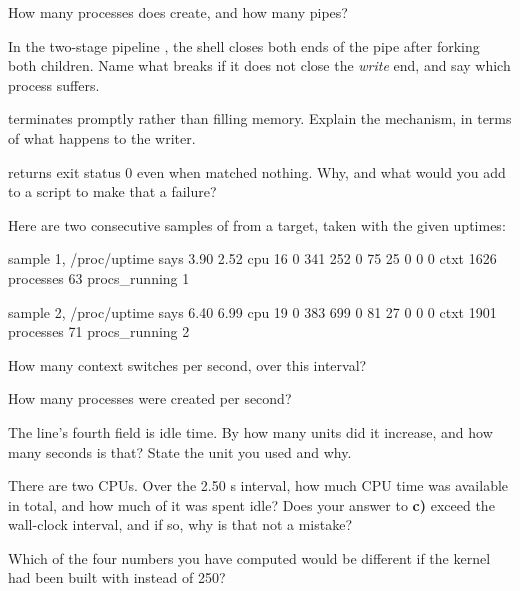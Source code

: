  How many processes does  create, and how many pipes?

 In the two-stage pipeline , the shell closes both ends of the pipe after
forking both children. Name what breaks if it does not close the \emph{write} end, and say which
process suffers.

  terminates promptly rather than filling memory. Explain the
mechanism, in terms of what happens to the writer.

  returns exit status 0 even when  matched
nothing. Why, and what would you add to a script to make that a failure?

\label{c2:ex:3}

Here are two consecutive samples of  from a target, taken with the given uptimes:

\begin{console}
sample 1, /proc/uptime says 3.90 2.52
cpu  16 0 341 252 0 75 25 0 0 0
ctxt 1626
processes 63
procs_running 1

sample 2, /proc/uptime says 6.40 6.99
cpu  19 0 383 699 0 81 27 0 0 0
ctxt 1901
processes 71
procs_running 2
\end{console}

 How many context switches per second, over this interval?

 How many processes were created per second?

 The  line's fourth field is idle time. By how many units did it increase, and
how many seconds is that? State the unit you used and why.

 There are two CPUs. Over the 2.50 s interval, how much CPU time was available in total,
and how much of it was spent idle? Does your answer to \textbf{c)} exceed the wall-clock interval,
and if so, why is that not a mistake?

 Which of the four numbers you have computed would be different if the kernel had been
built with  instead of 250?

\label{c2:ex:4}

